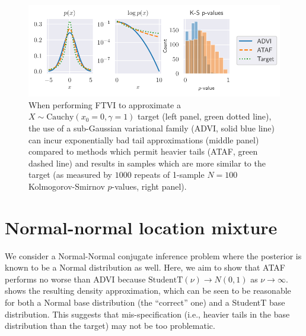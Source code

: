 \documentclass[twoside]{article}
\theoremstyle{definition}
\theoremstyle{remark}
\begin{document}
{\begin{figure}[htbp]
  \centering
  \includegraphics{../Figures/fat_tail_ks.pdf}
  \vspace{-6mm}
  \caption{
    When performing FTVI to approximate a $X \sim \text{Cauchy}(x_0 = 0, \gamma = 1)$ target (left panel, green dotted line),
    the use of a sub-Gaussian variational family (ADVI, solid blue line) can incur
    exponentially bad tail approximations (middle panel) compared to
    methods which permit heavier tails (ATAF, green dashed line) and results in
    samples which are more similar to the target (as measured by $1000$ repeats of
    1-sample $N=100$ Kolmogorov-Smirnov $p$-values, right panel).
  }
  \label{fig:cauchy_normal_student}
\end{figure}

\section{Normal-normal location mixture}
\label{sec:normal-normal-location-mixture}

We consider a Normal-Normal conjugate inference problem where the posterior
is known to be a Normal distribution as well. Here, we aim to show that ATAF
performs no worse than ADVI because $\text{StudentT}(\nu) \to N(0, 1)$ as $\nu \to \infty$.
 shows the resulting density approximation, which can
be seen to be reasonable for both a Normal base distribution (the ``correct'' one)
and a StudentT base distribution. This suggests that mis-specification (i.e., heavier
tails in the base distribution than the target) may not be too problematic.

}
\end{document}
